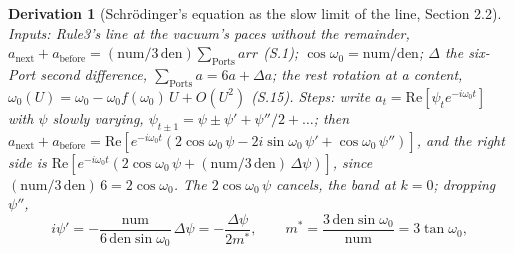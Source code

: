 \documentclass[pdflatex,sn-mathphys-num]{sn-jnl}
\newcommand{\num}{\mathrm{num}}
\newcommand{\den}{\mathrm{den}}
\newcommand{\abefore}{a_{\mathrm{before}}}
\newcommand{\anext}{a_{\mathrm{next}}}
\theoremstyle{thmstyleone}
\newtheorem{derivation}{Derivation}
\begin{document}
\begin{derivation}[Schr\"odinger's equation as the slow limit of the line, Section 2.2]
\emph{Inputs:} Rule3's line at the vacuum's paces without the remainder, $\anext + \abefore = (\num / 3\,\den)\sum_{\text{Ports}} arr$ (S.1); $\cos\omega_0 = \num / \den$; $\Delta$ the six-Port second difference, $\sum_{\text{Ports}} a = 6a + \Delta a$; the rest rotation at a content, $\omega_0(U) = \omega_0 - \omega_0 f(\omega_0)\,U + O(U^2)$ (S.15). \emph{Steps:} write $a_t = \mathrm{Re}[\psi_t e^{-i\omega_0 t}]$ with $\psi$ slowly varying, $\psi_{t \pm 1} = \psi \pm \psi' + \psi'' / 2 + \dots$; then $\anext + \abefore = \mathrm{Re}[e^{-i\omega_0 t}(2\cos\omega_0\,\psi - 2i\sin\omega_0\,\psi' + \cos\omega_0\,\psi'')]$, and the right side is $\mathrm{Re}[e^{-i\omega_0 t}(2\cos\omega_0\,\psi + (\num / 3\,\den)\,\Delta\psi)]$, since $(\num / 3\,\den)\,6 = 2\cos\omega_0$. The $2\cos\omega_0\,\psi$ cancels, the band at $k = 0$; dropping $\psi''$,
\[
i\psi' = -\frac{\num}{6\,\den\sin\omega_0}\,\Delta\psi = -\frac{\Delta\psi}{2m^*}, \qquad m^* = \frac{3\,\den\sin\omega_0}{\num} = 3\tan\omega_0,
\]

\end{derivation}
\end{document}
